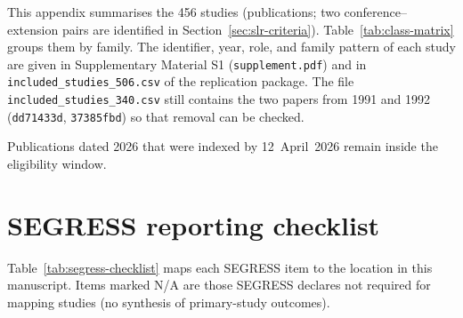 This appendix summarises the 456 studies (publications; two
conference--extension pairs are identified in
Section~\ref{sec:slr-criteria}). Table~\ref{tab:class-matrix}
groups them by family. The identifier, year, role, and family pattern of
each study are given in Supplementary Material S1
(\texttt{supplement.pdf}) and in \texttt{included\_studies\_506.csv} of
the replication package. The file \texttt{included\_studies\_340.csv}
still contains the two papers from 1991 and 1992 (\texttt{dd71433d},
\texttt{37385fbd}) so that removal can be checked.



Publications dated 2026 that were
indexed by 12~April~2026 remain inside the eligibility window.

\section{SEGRESS reporting checklist}
\label{app:segress}

Table~\ref{tab:segress-checklist} maps each SEGRESS item to the location in
this manuscript. Items marked N/A are those SEGRESS declares not required
for mapping studies (no synthesis of primary-study outcomes).


